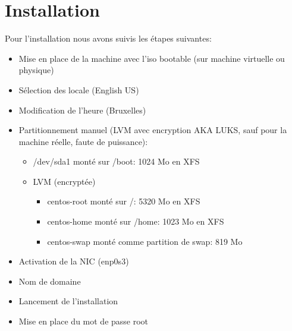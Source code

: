 \section{Installation}
Pour l'installation nous avons suivis les étapes suivantes:
\begin{itemize}
	\item Mise en place de la machine avec l'iso bootable (sur machine virtuelle ou physique)
	\item Sélection des locale (English US)
	\item Modification de l'heure (Bruxelles)
	\item Partitionnement manuel (LVM avec encryption AKA LUKS, sauf pour la machine réelle, faute de puissance):
	\begin{itemize}
		\item /dev/sda1 monté sur /boot: 1024 Mo en XFS
		\item LVM (encryptée)
		\begin{itemize}
			\item centos-root monté sur /: 5320 Mo en XFS
			\item centos-home monté sur /home: 1023 Mo en XFS
			\item centos-swap monté comme partition de swap: 819 Mo
		\end{itemize}
	\end{itemize}
	\item Activation de la NIC (enp0s3)
	\item Nom de domaine
	\item Lancement de l'installation
	\item Mise en place du mot de passe root
\end{itemize}


